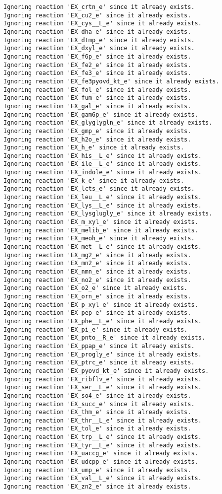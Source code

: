 \documentclass[
  letterpaper,
  DIV=11,
  numbers=noendperiod]{scrartcl}
\begin{document}
\begin{verbatim}
Ignoring reaction 'EX_crtn_e' since it already exists.
Ignoring reaction 'EX_cu2_e' since it already exists.
Ignoring reaction 'EX_cys__L_e' since it already exists.
Ignoring reaction 'EX_dha_e' since it already exists.
Ignoring reaction 'EX_dtmp_e' since it already exists.
Ignoring reaction 'EX_dxyl_e' since it already exists.
Ignoring reaction 'EX_f6p_e' since it already exists.
Ignoring reaction 'EX_fe2_e' since it already exists.
Ignoring reaction 'EX_fe3_e' since it already exists.
Ignoring reaction 'EX_fe3pyovd_kt_e' since it already exists.
Ignoring reaction 'EX_fol_e' since it already exists.
Ignoring reaction 'EX_fum_e' since it already exists.
Ignoring reaction 'EX_gal_e' since it already exists.
Ignoring reaction 'EX_gam6p_e' since it already exists.
Ignoring reaction 'EX_glyglygln_e' since it already exists.
Ignoring reaction 'EX_gmp_e' since it already exists.
Ignoring reaction 'EX_h2o_e' since it already exists.
Ignoring reaction 'EX_h_e' since it already exists.
Ignoring reaction 'EX_his__L_e' since it already exists.
Ignoring reaction 'EX_ile__L_e' since it already exists.
Ignoring reaction 'EX_indole_e' since it already exists.
Ignoring reaction 'EX_k_e' since it already exists.
Ignoring reaction 'EX_lcts_e' since it already exists.
Ignoring reaction 'EX_leu__L_e' since it already exists.
Ignoring reaction 'EX_lys__L_e' since it already exists.
Ignoring reaction 'EX_lysglugly_e' since it already exists.
Ignoring reaction 'EX_m_xyl_e' since it already exists.
Ignoring reaction 'EX_melib_e' since it already exists.
Ignoring reaction 'EX_meoh_e' since it already exists.
Ignoring reaction 'EX_met__L_e' since it already exists.
Ignoring reaction 'EX_mg2_e' since it already exists.
Ignoring reaction 'EX_mn2_e' since it already exists.
Ignoring reaction 'EX_nmn_e' since it already exists.
Ignoring reaction 'EX_no2_e' since it already exists.
Ignoring reaction 'EX_o2_e' since it already exists.
Ignoring reaction 'EX_orn_e' since it already exists.
Ignoring reaction 'EX_p_xyl_e' since it already exists.
Ignoring reaction 'EX_pep_e' since it already exists.
Ignoring reaction 'EX_phe__L_e' since it already exists.
Ignoring reaction 'EX_pi_e' since it already exists.
Ignoring reaction 'EX_pnto__R_e' since it already exists.
Ignoring reaction 'EX_ppap_e' since it already exists.
Ignoring reaction 'EX_progly_e' since it already exists.
Ignoring reaction 'EX_ptrc_e' since it already exists.
Ignoring reaction 'EX_pyovd_kt_e' since it already exists.
Ignoring reaction 'EX_ribflv_e' since it already exists.
Ignoring reaction 'EX_ser__L_e' since it already exists.
Ignoring reaction 'EX_so4_e' since it already exists.
Ignoring reaction 'EX_succ_e' since it already exists.
Ignoring reaction 'EX_thm_e' since it already exists.
Ignoring reaction 'EX_thr__L_e' since it already exists.
Ignoring reaction 'EX_tol_e' since it already exists.
Ignoring reaction 'EX_trp__L_e' since it already exists.
Ignoring reaction 'EX_tyr__L_e' since it already exists.
Ignoring reaction 'EX_uaccg_e' since it already exists.
Ignoring reaction 'EX_udcpp_e' since it already exists.
Ignoring reaction 'EX_ump_e' since it already exists.
Ignoring reaction 'EX_val__L_e' since it already exists.
Ignoring reaction 'EX_zn2_e' since it already exists.
\end{verbatim}
\end{document}
